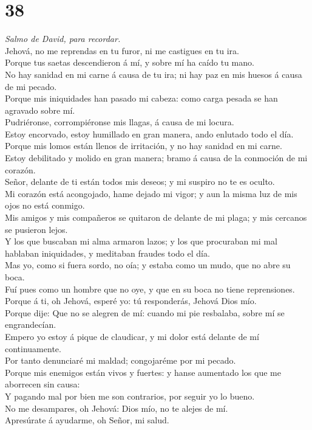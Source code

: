 \hypertarget{section-37}{%
\section{38}\label{section-37}}

 \emph{Salmo de David, para recordar.}\\
Jehová, no me reprendas en tu furor, ni me castigues en tu ira.\\
 Porque tus saetas descendieron á mí, y sobre mí ha caído tu
mano.\\
 No hay sanidad en mi carne á causa de tu ira; ni hay paz en
mis huesos á causa de mi pecado.\\
 Porque mis iniquidades han pasado mi cabeza: como carga
pesada se han agravado sobre mí.\\
 Pudriéronse, corrompiéronse mis llagas, á causa de mi
locura.\\
 Estoy encorvado, estoy humillado en gran manera, ando
enlutado todo el día.\\
 Porque mis lomos están llenos de irritación, y no hay
sanidad en mi carne.\\
 Estoy debilitado y molido en gran manera; bramo á causa de
la conmoción de mi corazón.\\
 Señor, delante de ti están todos mis deseos; y mi suspiro
no te es oculto.\\
 Mi corazón está acongojado, hame dejado mi vigor; y aun la
misma luz de mis ojos no está conmigo.\\
 Mis amigos y mis compañeros se quitaron de delante de mi
plaga; y mis cercanos se pusieron lejos.\\
 Y los que buscaban mi alma armaron lazos; y los que
procuraban mi mal hablaban iniquidades, y meditaban fraudes todo el
día.\\
 Mas yo, como si fuera sordo, no oía; y estaba como un
mudo, que no abre su boca.\\
 Fuí pues como un hombre que no oye, y que en su boca no
tiene reprensiones.\\
 Porque á ti, oh Jehová, esperé yo: tú responderás, Jehová
Dios mío.\\
 Porque dije: Que no se alegren de mí: cuando mi pie
resbalaba, sobre mí se engrandecían.\\
 Empero yo estoy á pique de claudicar, y mi dolor está
delante de mí continuamente.\\
 Por tanto denunciaré mi maldad; congojaréme por mi
pecado.\\
 Porque mis enemigos están vivos y fuertes: y hanse
aumentado los que me aborrecen sin causa:\\
 Y pagando mal por bien me son contrarios, por seguir yo lo
bueno.\\
 No me desampares, oh Jehová: Dios mío, no te alejes de
mí.\\
 Apresúrate á ayudarme, oh Señor, mi salud.


